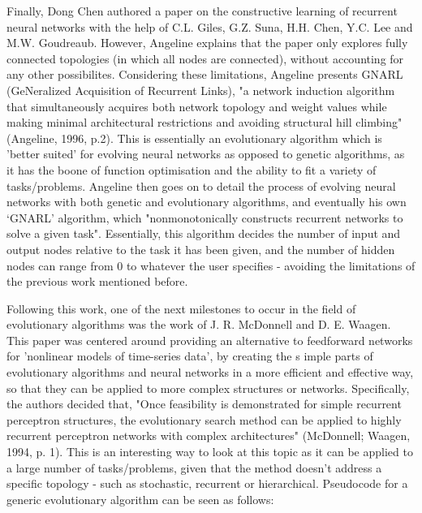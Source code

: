 \documentclass[12pt,a4paper]{article}
\begin{document}
\noindent
Finally, Dong Chen authored a paper on the constructive learning of recurrent neural networks with the help of C.L. Giles, G.Z. Suna, H.H. Chen, Y.C. Lee and M.W. Goudreaub. However, Angeline explains that the paper only explores fully connected topologies (in which all nodes are connected), without accounting for any other possibilites. Considering these limitations, Angeline presents GNARL (GeNeralized Acquisition of Recurrent Links),  "a network induction algorithm that simultaneously acquires both network topology and weight values while making minimal architectural restrictions and avoiding structural hill climbing" (Angeline, 1996, p.2). This is essentially an evolutionary algorithm which is 'better suited' for evolving neural networks as opposed to genetic algorithms, as it has the boone of function optimisation and the ability to fit a variety of tasks/problems. Angeline then goes on to detail the process of evolving neural networks with both genetic and evolutionary algorithms, and eventually his own `GNARL' algorithm, which "nonmonotonically constructs recurrent networks to solve a given task". Essentially, this algorithm decides the number of input and output nodes relative to the task it has been given, and the number of hidden nodes can range from 0 to whatever the user specifies - avoiding the limitations of the previous work mentioned before.

\noindent
Following this work, one of the next milestones to occur in the field of evolutionary algorithms was the work of J. R. McDonnell and D. E. Waagen. This paper was centered around providing an alternative to feedforward networks for 'nonlinear models of time-series data', by creating the s imple parts of evolutionary algorithms and neural networks in a more efficient and effective way, so that they can be applied to more complex structures or networks. Specifically, the authors decided that, "Once feasibility is demonstrated for simple recurrent perceptron structures, the evolutionary search method can be applied to highly recurrent perceptron networks with complex architectures" (McDonnell; Waagen, 1994, p. 1). This is an interesting way to look at this topic as it can be applied to a large number of tasks/problems, given that the method doesn't address a specific topology - such as stochastic, recurrent or hierarchical. Pseudocode for a generic evolutionary algorithm can be seen as follows: 
\end{document}

